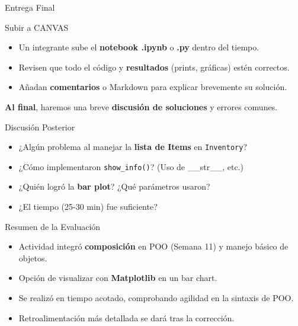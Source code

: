 \documentclass[10pt]{beamer}
\begin{document}
\begin{frame}{Entrega Final}
  \begin{block}{Subir a CANVAS}
    \begin{itemize}
      \item Un integrante sube el \textbf{notebook .ipynb} o \textbf{.py} dentro del tiempo.
      \item Revisen que todo el código y \textbf{resultados} (prints, gráficas) estén correctos.
      \item Añadan \textbf{comentarios} o Markdown para explicar brevemente su solución.
    \end{itemize}
  \end{block}
  \vspace{0.3cm}
  \textbf{Al final}, haremos una breve \textbf{discusión de soluciones} y errores comunes.
\end{frame}

\begin{frame}{Discusión Posterior}
  \begin{itemize}
    \item ¿Algún problema al manejar la \textbf{lista de Items} en \texttt{Inventory}?
    \item ¿Cómo implementaron \texttt{show\_info()}? (Uso de \_\_str\_\_, etc.)
    \item ¿Quién logró la \textbf{bar plot}? ¿Qué parámetros usaron?
    \item ¿El tiempo (25-30 min) fue suficiente?
  \end{itemize}
\end{frame}

\begin{frame}{Resumen de la Evaluación}
  \begin{itemize}
    \item Actividad integró \textbf{composición} en POO (Semana 11) y manejo básico de objetos.
    \item Opción de visualizar con \textbf{Matplotlib} en un bar chart.
    \item Se realizó en tiempo acotado, comprobando agilidad en la sintaxis de POO.
    \item Retroalimentación más detallada se dará tras la corrección.
  \end{itemize}
\end{frame}
\end{document}
